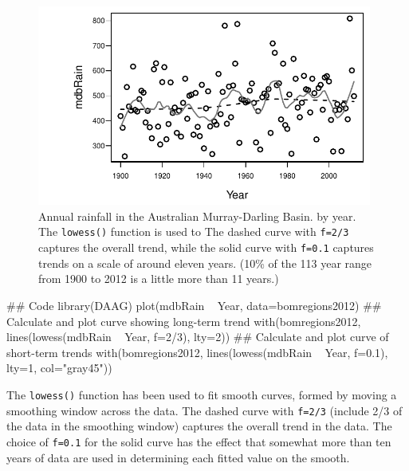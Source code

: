 \documentclass{tufte-book}\usepackage[]{graphicx}\usepackage[]{color}
\newcommand{\txtt}[1]{\texttt{#1}}
\begin{document}
\begin{figure}
\begin{Schunk}


\centerline{\includegraphics[width=0.98\textwidth]{figs/05-MDBrainfall-1} }

\end{Schunk}
\caption{Annual rainfall in the Australian Murray-Darling Basin.
by year.  The \txtt{lowess()} function is used to
The dashed curve with \txtt{f=2/3} captures the
overall trend, while the solid curve with \txtt{f=0.1}
captures trends on a scale of around eleven years. (10\% of the 113 year
range from 1900 to 2012 is a little more than 11 years.)\label{fig:mdbRain}}
\vspace*{-6pt}
\end{figure}

\begin{fullwidth}

\begin{Schunk}
\begin{Sinput}
## Code
library(DAAG)
plot(mdbRain ~ Year, data=bomregions2012)
## Calculate and plot curve showing long-term trend
with(bomregions2012, lines(lowess(mdbRain ~ Year, f=2/3), lty=2))
## Calculate and plot curve of short-term trends
with(bomregions2012, lines(lowess(mdbRain ~ Year, f=0.1),
                           lty=1, col="gray45"))
\end{Sinput}
\end{Schunk}

\end{fullwidth}

The \txtt{lowess()} function has been used to fit smooth curves,
formed by moving a smoothing window across the data.
The dashed curve with \txtt{f=2/3} (include 2/3 of the data in the
smoothing window) captures the overall trend in the data.
The choice of \txtt{f=0.1} for the solid curve has the effect that
somewhat more than ten years of data are used in determining each
fitted value on the smooth.
\end{document}

